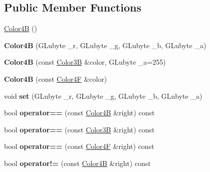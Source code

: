 \subsection*{Public Member Functions}
\begin{DoxyCompactItemize}
\item 
\hyperlink{structColor4B_af106d17e3139338bab6db5c64beea8a9}{Color4B} ()
\item 
\mbox{\label{structColor4B_ad7300201bf96c3868b738d9227a41d0d}} 
{\bfseries Color4B} (G\+Lubyte \+\_\+r, G\+Lubyte \+\_\+g, G\+Lubyte \+\_\+b, G\+Lubyte \+\_\+a)
\item 
\mbox{\label{structColor4B_a633e3a98bbfc5ba2b7371657748355ed}} 
{\bfseries Color4B} (const \hyperlink{structColor3B}{Color3B} \&color, G\+Lubyte \+\_\+a=255)
\item 
\mbox{\label{structColor4B_aa4231abd6ba89ae3ab94bf2ae547c46c}} 
{\bfseries Color4B} (const \hyperlink{structColor4F}{Color4F} \&color)
\item 
\mbox{\label{structColor4B_aea739bdeaed827a7f67ab180987cca3f}} 
void {\bfseries set} (G\+Lubyte \+\_\+r, G\+Lubyte \+\_\+g, G\+Lubyte \+\_\+b, G\+Lubyte \+\_\+a)
\item 
\mbox{\label{structColor4B_a1155bf0daaab1b04747aeee62a20984f}} 
bool {\bfseries operator==} (const \hyperlink{structColor4B}{Color4B} \&right) const
\item 
\mbox{\label{structColor4B_ac126dea351344cb23024a545932de5e2}} 
bool {\bfseries operator==} (const \hyperlink{structColor3B}{Color3B} \&right) const
\item 
\mbox{\label{structColor4B_aa8d349ab7315761735ae8484083e337b}} 
bool {\bfseries operator==} (const \hyperlink{structColor4F}{Color4F} \&right) const
\item 
\mbox{\label{structColor4B_a983918192f9ab7c135a1c55bbb26e554}} 
bool {\bfseries operator!=} (const \hyperlink{structColor4B}{Color4B} \&right) const
\item 
\mbox{\label{structColor4B_a2a327073c83eabc3068b5a0c83eeb84e}} 

\end{DoxyCompactItemize}
